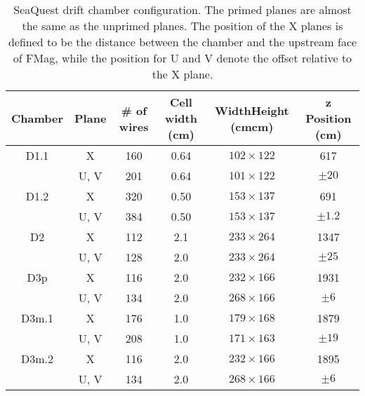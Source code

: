 \documentclass[../main.tex]{subfiles}
\begin{document}
\begin{table}[h!]
	\centering
	\caption{SeaQuest drift chamber configuration. The primed planes are almost the same as the unprimed
		planes. The position of the X planes is defined to be the distance between the chamber and the
		upstream face of FMag, while the position for U and V denote the offset relative to the X plane.}
	\label{table:chamber}
	\begin{tabular}{cccccc}
		\hline
		Chamber & Plane & \# of wires & Cell width (\unit{\cm}) & Width\texttimes Height (\unit{\cm}\texttimes\unit{\cm}) & z Position (\unit{cm}) \\ \hline
		D1.1    & X     & \num{160}   & \num{0.64}              & $102\times 122$                                         & \num{617}              \\
		        & U, V  & \num{201}   & \num{0.64}              & $101\times 122$                                         & $\pm20$                \\
		D1.2    & X     & \num{320}   & \num{0.50}              & $153\times 137$                                         & \num{691}              \\
		        & U, V  & \num{384}   & \num{0.50}              & $153\times 137$                                         & $\pm1.2$               \\
		D2      & X     & \num{112}   & \num{2.1}               & $233\times264$                                          & \num{1347}             \\
		        & U, V  & \num{128}   & \num{2.0}               & $233\times264$                                          & $\pm25$                \\
		D3p     & X     & \num{116}   & \num{2.0}               & $232\times166$                                          & \num{1931}             \\
		        & U, V  & \num{134}   & \num{2.0}               & $268\times166$                                          & $\pm6$                 \\
		D3m.1   & X     & \num{176}   & \num{1.0}               & $179\times168$                                          & \num{1879}             \\
		        & U, V  & \num{208}   & \num{1.0}               & $171\times163$                                          & $\pm19$                \\
		D3m.2   & X     & \num{116}   & \num{2.0}               & $232\times166$                                          & \num{1895}             \\
		        & U, V  & \num{134}   & \num{2.0}               & $268\times166$                                          & $\pm6$                 \\ \hline
	\end{tabular}
\end{table}
\end{document}
